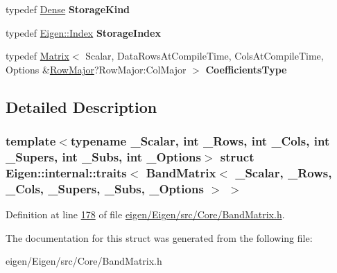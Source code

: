 \begin{DoxyCompactItemize}
typedef \hyperlink{struct_eigen_1_1_dense}{Dense} {\bfseries Storage\+Kind}
\item 
\mbox{\label{struct_eigen_1_1internal_1_1traits_3_01_band_matrix_3_01___scalar_00_01___rows_00_01___cols_00_03762db5085b3b9896d5a124beda4837b_a7cde578b2a145709789123f8922b66fa}} 
typedef \hyperlink{namespace_eigen_a62e77e0933482dafde8fe197d9a2cfde}{Eigen\+::\+Index} {\bfseries Storage\+Index}
\item 
\mbox{\label{struct_eigen_1_1internal_1_1traits_3_01_band_matrix_3_01___scalar_00_01___rows_00_01___cols_00_03762db5085b3b9896d5a124beda4837b_aafd270c1440909d8c2c7901e57e73f9e}} 
typedef \hyperlink{group___core___module_class_eigen_1_1_matrix}{Matrix}$<$ Scalar, Data\+Rows\+At\+Compile\+Time, Cols\+At\+Compile\+Time, Options \&\hyperlink{group__enums_ggaacded1a18ae58b0f554751f6cdf9eb13acfcde9cd8677c5f7caf6bd603666aae3}{Row\+Major}?Row\+Major\+:\+Col\+Major $>$ {\bfseries Coefficients\+Type}
\end{DoxyCompactItemize}


\subsection{Detailed Description}
\subsubsection*{template$<$typename \+\_\+\+Scalar, int \+\_\+\+Rows, int \+\_\+\+Cols, int \+\_\+\+Supers, int \+\_\+\+Subs, int \+\_\+\+Options$>$\newline
struct Eigen\+::internal\+::traits$<$ Band\+Matrix$<$ \+\_\+\+Scalar, \+\_\+\+Rows, \+\_\+\+Cols, \+\_\+\+Supers, \+\_\+\+Subs, \+\_\+\+Options $>$ $>$}



Definition at line \hyperlink{eigen_2_eigen_2src_2_core_2_band_matrix_8h_source_l00178}{178} of file \hyperlink{eigen_2_eigen_2src_2_core_2_band_matrix_8h_source}{eigen/\+Eigen/src/\+Core/\+Band\+Matrix.\+h}.



The documentation for this struct was generated from the following file\+:\begin{DoxyCompactItemize}
\item 
eigen/\+Eigen/src/\+Core/\+Band\+Matrix.\+h\end{DoxyCompactItemize}
